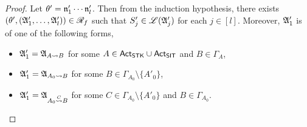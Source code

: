 \begin{proof}
    Let $\theta'= \mathfrak{n}'_1 \cdots \mathfrak{n}'_l$. Then from the induction hypothesis, there exists $(\theta', ({\mathfrak{A} }'_1, \dots, {\mathfrak{A} }'_l)) \in \mathscr{R}_f$ such that $S'_j \in {\mathscr{L} }({\mathfrak{A} }'_j)$ for each $j \in [l]$. Moreover, ${\mathfrak{A} }'_1$ is of one of the following forms,
 \begin{itemize}
   \item  ${\mathfrak{A} }'_1 = {\mathfrak{A} }_{A \rightsquigarrow B}$ for some $A \in {\sf Act}_{\sf STK} \cup {\sf Act}_{\sf SIT}$ and $B \in \Gamma_A$, 
   \item ${\mathfrak{A} }'_1 = {\mathfrak{A} }_{A_0 \rightsquigarrow B}$ for some $B \in \Gamma_{A_0} \setminus \{A'_0\}$, 
   \item ${\mathfrak{A} }'_1 = {\mathfrak{A} }_{A_0 \stackrel{C}{\rightsquigarrow} B}$ for some $C \in \Gamma_{A_0} \setminus \{A'_0\}$ and $B \in \Gamma_{A_0}$. 
  \end{itemize}
    

\end{proof}
